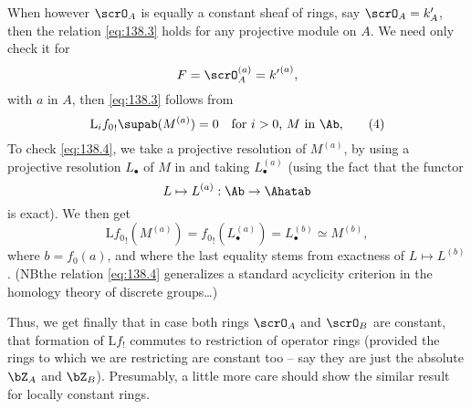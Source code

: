 When however $\scrO_A$ is equally a constant sheaf of rings, say
$\scrO_A=k'_A$, then the relation \eqref{eq:138.3} holds for any
projective module on $A$. We need only check it for
\[F=\scrO_A^{(a)} = {k'}^{(a)},\]
with $a$ in $A$, then \eqref{eq:138.3} follows from
\begin{equation}
  \label{eq:138.4}
  \mathrm L_i {f_0}_!\supab( M^{(a)} )=0 \quad
  \text{for $i>0$, $M$ in \Ab,}\tag{4}
\end{equation}
To check \eqref{eq:138.4}, we take a projective resolution of
$M^{(a)}$, by using a projective resolution $L_\bullet$ of $M$ in
\Ab{} and taking $L_\bullet^{(a)}$ (using the fact that the functor
\[L\mapsto L^{(a)}:\Ab\to\Ahatab\]
is exact). We then get
\[\mathrm L{f_0}_!(M^{(a)}) = {f_0}_! (L_\bullet^{(a)}) =
  L_\bullet^{(b)} \simeq M^{(b)},\]
where $b=f_0(a)$, and where the last equality stems from exactness of
$L\mapsto L^{(b)}$. (NB\enspace the relation \eqref{eq:138.4}
generalizes a standard acyclicity criterion in the homology theory of
discrete groups\dots)

Thus, we get finally that in case both rings $\scrO_A$ and $\scrO_B$
are constant, that formation of $\mathrm Lf_!$ commutes to restriction
of operator rings (provided the rings to which we are restricting are
constant too -- say they are just the absolute $\bZ_A$ and
$\bZ_B$). Presumably, a little more care should show the similar
result for locally constant rings.

